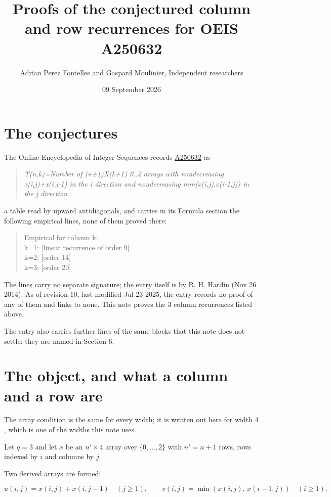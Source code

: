 \documentclass[11pt]{article}
\title{Proofs of the conjectured column and row recurrences for OEIS A250632}
\author{Adrian Perez Fontelles and Gaspard Moulinier, Independent researchers}
\date{09 September 2026}
\theoremstyle{definition}
\begin{document}
\maketitle
\section{The conjectures}

The Online Encyclopedia of Integer Sequences records \href{https://oeis.org/A250632}{A250632} as

\begin{quote}\itshape T(n,k)=Number of (n+1)X(k+1) 0..2 arrays with nondecreasing x(i,j)+x(i,j-1) in the i direction and nondecreasing min(x(i,j),x(i-1,j)) in the j direction\end{quote}

a table read by upward antidiagonals, and carries in its Formula section the following empirical lines, none of them proved there:

\begin{quote}\ttfamily Empirical for column k:\\
k=1: [linear recurrence of order 9]\\k=2: [order 14]\\k=3: [order 20]\end{quote}

The lines carry no separate signature; the entry itself is by R. H. Hardin (Nov 26 2014). As of revision 10, last modified Jul 23 2025, the entry records no proof of any of them and links to none. This note proves the 3 column recurrences listed above.

The entry also carries further lines of the same blocks that this note does not settle; they are named in Section 6.

\section{The object, and what a column and a row are}

The array condition is the same for every width; it is written out here for width $4$, which is one of the widths this note uses.

Let $q = 3$ and let $x$ be an $n' \times 4$ array over $\{0,\dots,2\}$ with $n' = n + 1$ rows, rows indexed by $i$ and columns by $j$.

Two derived arrays are formed:

\[u(i,j) = x(i,j) + x(i,j{-}1)\quad (j \ge 1), \qquad v(i,j) = \min(x(i,j),\,x(i{-}1,j))\quad (i \ge 1).\]
\end{document}
